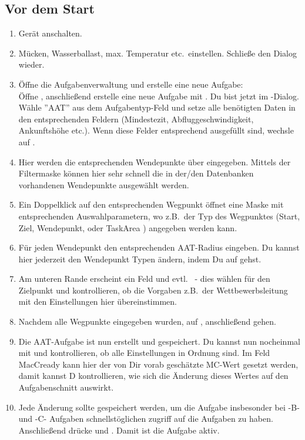 \subsection*{Vor dem Start}
\begin{enumerate}
\item  Gerät anschalten.
\item  Mücken, Wasserballast, max. Temperatur etc.\ einstellen.
 Schließe den Dialog wieder.
\item Öffne die Aufgabenverwaltung und erstelle eine neue Aufgabe:\\
Öffne , anschließend erstelle eine neue Aufgabe mit .
Du bist jetzt im  -Dialog. Wähle ''AAT'' aus dem Aufgabentyp-Feld und setze alle benötigten Daten in den entsprechenden Feldern (Mindestezit, Abfluggeschwindigkeit, Ankunftshöhe etc.).
Wenn diese Felder entsprechend ausgefüllt sind, wechsle auf .
\item Hier werden die entsprechenden Wendepunkte über  eingegeben.
Mittels der  Filtermaske können hier sehr schnell die in der/den Datenbanken vorhandenen Wendepunkte ausgewählt
werden.
\item Ein Doppelklick auf den entsprechenden Wegpunkt öffnet eine Maske mit entsprechenden Auswahlparametern, wo z.B.\ der Typ des Wegpunktes (Start, Ziel, Wendepunkt, oder TaskArea )
angegeben werden kann.
\item Für jeden Wendepunkt den entsprechenden AAT-Radius eingeben. Du kannst hier jederzeit den Wendepunkt Typen ändern, indem Du auf  gehst.
\item Am unteren Rande erscheint ein Feld  und evtl.\  - dies wählen für den Zielpunkt und kontrollieren, ob die Vorgaben z.B.\
der Wettbewerbsleitung mit den Einstellungen hier übereinstimmen.
\tip \item Nachdem alle Wegpunkte eingegeben wurden, auf , anschließend  gehen.
\item  Die AAT-Aufgabe ist nun erstellt und gespeichert. Du kannst nun nocheinmal mit \button{Rechner} und   kontrollieren, ob alle Einstellungen
in Ordnung sind. Im Feld MacCready kann hier der von Dir vorab geschätzte MC-Wert gesetzt werden, damit kannst D kontrollieren,
wie sich die Änderung dieses Wertes auf den Aufgabenschnitt auswirkt.
\tip \item Jede Änderung sollte gespeichert werden, um die Aufgabe insbesonder bei -B-  und -C- Aufgaben schnellstöglichen zugriff auf die Aufgaben zu haben.
Anschließend drücke \button{Schließen} und \button{Fliegen}. Damit ist die Aufgabe aktiv.
\end{enumerate}

